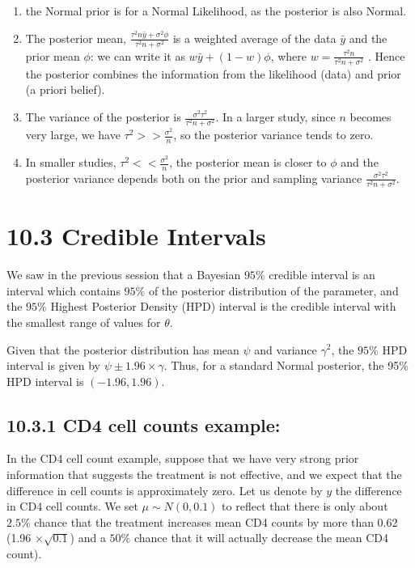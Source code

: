 \documentclass[letterpaper,10pt,english]{jupyterBook}
\begin{document}
\begin{enumerate}
%
\item {} 
\sphinxAtStartPar
the Normal prior is  for a Normal Likelihood, as the posterior is also Normal.

\item {} 
\sphinxAtStartPar
The posterior mean, \(\frac{ \tau^2 n\bar{y} + \sigma^2\phi }{\tau^2 n + \sigma^2}\) is a weighted average of the data \(\bar y \) and the prior mean \(\phi\): we can write it as \(w \bar{y} + (1-w) \phi\), where \(w= \frac{\tau^2 n}{\tau^2 n + \sigma^2}\) . Hence the posterior combines the information from the likelihood (data) and prior (a priori belief).

\item {} 
\sphinxAtStartPar
The variance of the posterior is  \(\frac{\sigma^2\tau^2}{\tau^2n+\sigma^2}\). In a larger study, since \(n\) becomes very large, we have \(\tau^2 >> \frac{\sigma^2}{n}\), so the posterior variance tends to zero.

\item {} 
\sphinxAtStartPar
In smaller studies, \(\tau^2 << \frac{\sigma^2}{n}\), the posterior mean is closer to \(\phi\) and the posterior variance depends both on the prior and sampling variance \(\frac{\sigma^2\tau^2}{\tau^2n+\sigma^2}\).

\end{enumerate}


\section{10.3 Credible Intervals}
\label{\detokenize{10.d. Bayesian Statistics II:credible-intervals}}\label{\detokenize{10.d. Bayesian Statistics II::doc}}
\sphinxAtStartPar
We saw in the previous session that a Bayesian \(95\%\) credible interval is an interval which contains \(95\% \) of the posterior distribution of the parameter, and the \(95 \%\) Highest Posterior Density (HPD) interval is the credible interval with the smallest range of values for \(\theta\).

\sphinxAtStartPar
Given that the posterior distribution has mean \(\psi\) and variance \(\gamma^{2}\), the \(95\%\) HPD interval is given by
\(\psi \pm 1.96 \times \gamma\). Thus, for a standard Normal posterior, the 95\% HPD interval is \((-1.96,1.96).\)


\subsection{10.3.1 CD4 cell counts example:}
\label{\detokenize{10.d. Bayesian Statistics II:cd4-cell-counts-example}}
\sphinxAtStartPar
In the CD4 cell count example, suppose that we have very strong prior information that suggests the treatment is not effective, and we expect that the difference in cell counts is approximately zero. Let us denote by \(y\) the difference in CD4 cell counts. We set \(\mu \sim N(0, 0.1)\) to reflect that there is only about \(2.5\%\) chance that the treatment increases mean CD4 counts by more than 0.62 (1.96 \(\times \sqrt{0.1}\)) and a \(50\%\) chance that it will actually decrease the mean CD4 count).
\end{document}

